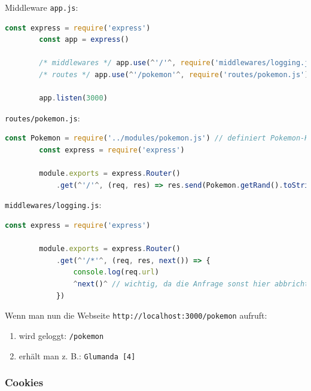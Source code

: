 \begin{example}{Middleware}
    \texttt{app.js}:
    \begin{lstlisting}[language=JavaScript]
        const express = require('express')
        const app = express()

        /* middlewares */ app.use(^'/'^, require('middlewares/logging.js')) // 1.
        /* routes */ app.use(^'/pokemon'^, require('routes/pokemon.js')) // 2.

        app.listen(3000)
    \end{lstlisting}

    \texttt{routes/pokemon.js}:
    \begin{lstlisting}[language=JavaScript]
        const Pokemon = require('../modules/pokemon.js') // definiert Pokemon-Klasse
        const express = require('express')
        
        module.exports = express.Router()
            .get(^'/'^, (req, res) => res.send(Pokemon.getRand().toString()) )
    \end{lstlisting}

    \texttt{middlewares/logging.js}:
    \begin{lstlisting}[language=JavaScript]
        const express = require('express')
        
        module.exports = express.Router()
            .get(^'/*'^, (req, res, next()) => {
                console.log(req.url)
                ^next()^ // wichtig, da die Anfrage sonst hier abbricht
            })
    \end{lstlisting}

    Wenn man nun die Webseite \texttt{http://localhost:3000/pokemon} aufruft:
    \begin{enumerate}
        \item wird geloggt: \texttt{/pokemon}
        \item erhält man z. B.: \texttt{Glumanda [4]}
    \end{enumerate}
\end{example}

\subsubsection{Cookies}

